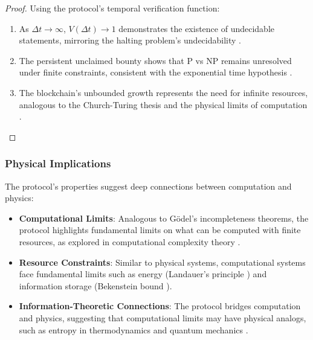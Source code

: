 \documentclass[12pt]{report}
\begin{document}
\begin{proof}
Using the protocol's temporal verification function:
\begin{enumerate}
    \item As $\Delta t \to \infty$, $V(\Delta t) \to 1$ demonstrates the existence of undecidable statements, mirroring the halting problem's undecidability \cite{Turing1936}.
    \item The persistent unclaimed bounty shows that P vs NP remains unresolved under finite constraints, consistent with the exponential time hypothesis \cite{ImpagliazzoPaturi2001}.
    \item The blockchain's unbounded growth represents the need for infinite resources, analogous to the Church-Turing thesis \cite{Church1936} and the physical limits of computation \cite{Lloyd2000}.
\end{enumerate}
\end{proof}

\subsubsection{Physical Implications}
The protocol's properties suggest deep connections between computation and physics:
\begin{itemize}
    \item \textbf{Computational Limits}: Analogous to Gödel's incompleteness theorems, the protocol highlights fundamental limits on what can be computed with finite resources, as explored in computational complexity theory \cite{Aaronson2013}.
    \item \textbf{Resource Constraints}: Similar to physical systems, computational systems face fundamental limits such as energy (Landauer's principle \cite{Landauer1961}) and information storage (Bekenstein bound \cite{Bekenstein1981}).
    \item \textbf{Information-Theoretic Connections}: The protocol bridges computation and physics, suggesting that computational limits may have physical analogs, such as entropy in thermodynamics \cite{Shannon1948} and quantum mechanics \cite{Feynman1982}.
\end{itemize}
\end{document}
